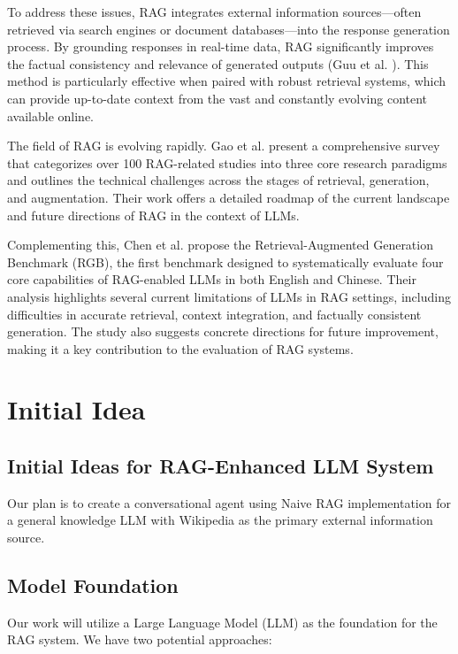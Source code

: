 \documentclass[fleqn,moreauthors,10pt]{ds_report}
\begin{document}
To address these issues, RAG integrates external information sources—often retrieved via search engines or document databases—into the response generation process. By grounding responses in real-time data, RAG significantly improves the factual consistency and relevance of generated outputs (Guu et al. \cite{guu}). This method is particularly effective when paired with robust retrieval systems, which can provide up-to-date context from the vast and constantly evolving content available online.

The field of RAG is evolving rapidly. Gao et al. \cite{gao} present a comprehensive survey that categorizes over 100 RAG-related studies into three core research paradigms and outlines the technical challenges across the stages of retrieval, generation, and augmentation. Their work offers a detailed roadmap of the current landscape and future directions of RAG in the context of LLMs.

Complementing this, Chen et al. \cite{chen} propose the Retrieval-Augmented Generation Benchmark (RGB), the first benchmark designed to systematically evaluate four core capabilities of RAG-enabled LLMs in both English and Chinese. Their analysis highlights several current limitations of LLMs in RAG settings, including difficulties in accurate retrieval, context integration, and factually consistent generation. The study also suggests concrete directions for future improvement, making it a key contribution to the evaluation of RAG systems.


\section*{Initial Idea}
\subsection*{Initial Ideas for RAG-Enhanced LLM System}

Our plan is to create a conversational agent using Naive RAG implementation \cite{gao} for a general knowledge LLM with Wikipedia as the primary external information source.

\subsection*{Model Foundation}
Our work will utilize a Large Language Model (LLM) as the foundation for the RAG system. We have two potential approaches:
\end{document}
